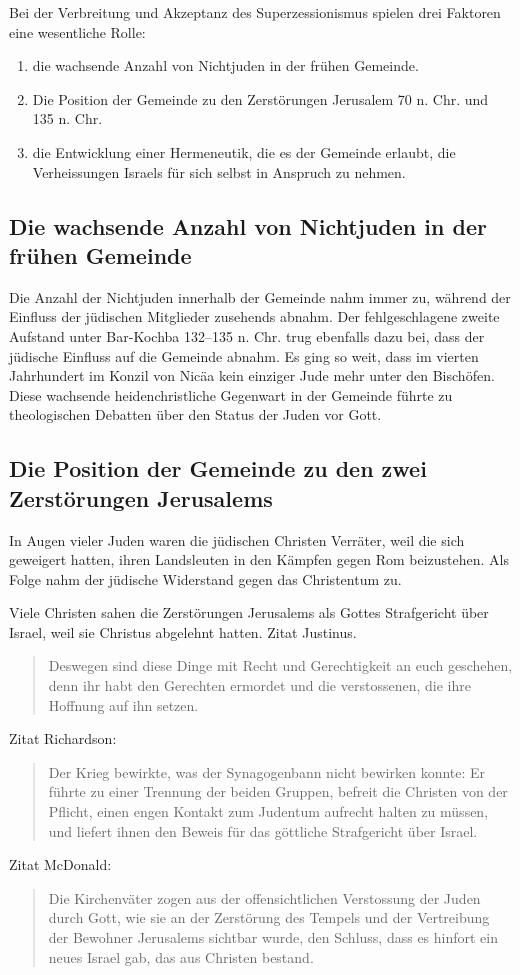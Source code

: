 \documentclass{../../inc/mybib}
\newcommand{\sz}{Superzessionismus}
\begin{document}
    Bei der Verbreitung und Akzeptanz des \sz{} spielen drei Faktoren eine wesentliche Rolle:
    \begin{enumerate}
        \item die wachsende Anzahl von Nichtjuden in der frühen Gemeinde.
        \item Die Position der Gemeinde zu den Zerstörungen Jerusalem 70 n. Chr. und 135 n. Chr.
        \item die Entwicklung einer Hermeneutik, die es der Gemeinde erlaubt, die Verheissungen Israels für sich selbst in Anspruch zu nehmen.
    \end{enumerate}
    \subsection{Die wachsende Anzahl von Nichtjuden in der frühen Gemeinde}
    Die Anzahl der Nichtjuden innerhalb der Gemeinde nahm immer zu, während der Einfluss der jüdischen Mitglieder zusehends abnahm. Der fehlgeschlagene zweite Aufstand unter Bar-Kochba 132--135 n. Chr. trug ebenfalls dazu bei, dass der jüdische Einfluss auf die Gemeinde abnahm. Es ging so weit, dass im vierten Jahrhundert im Konzil von Nicäa kein einziger Jude mehr unter den Bischöfen. Diese wachsende heidenchristliche Gegenwart in der Gemeinde führte zu theologischen Debatten über den Status der Juden vor Gott.
    \subsection{Die Position der Gemeinde zu den zwei Zerstörungen Jerusalems}
    In Augen vieler Juden waren die jüdischen Christen Verräter, weil die sich geweigert hatten, ihren Landsleuten in den Kämpfen gegen Rom beizustehen. Als Folge nahm der jüdische Widerstand gegen das Christentum zu.

    Viele Christen sahen die Zerstörungen Jerusalems als Gottes Strafgericht über Israel, weil sie Christus abgelehnt hatten. Zitat Justinus.
    \begin{quote}
        Deswegen sind diese Dinge mit Recht und Gerechtigkeit an euch geschehen, denn ihr habt den Gerechten ermordet und die verstossenen, die ihre Hoffnung auf ihn setzen.
    \end{quote}
    Zitat Richardson:
    \begin{quote}
        Der Krieg bewirkte, was der Synagogenbann nicht bewirken konnte: Er führte zu einer Trennung der beiden Gruppen, befreit die Christen von der Pflicht, einen engen Kontakt zum Judentum aufrecht halten zu müssen, und liefert ihnen den Beweis für das göttliche Strafgericht über Israel.
    \end{quote}
    Zitat McDonald:
    \begin{quote}
        Die Kirchenväter zogen aus der offensichtlichen Verstossung der Juden durch Gott, wie sie an der Zerstörung des Tempels und der Vertreibung der Bewohner Jerusalems sichtbar wurde, den Schluss, dass es hinfort ein neues Israel gab, das aus Christen bestand.
    \end{quote}
\end{document}
